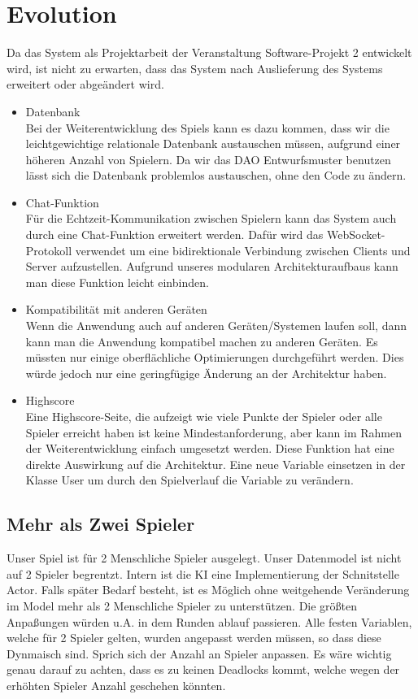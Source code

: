 \documentclass[fontsize=12pt,paper=a4,twoside]{scrartcl}
\begin{document}
\section{Evolution} \label{sec:evolution}

Da das System als Projektarbeit der Veranstaltung Software-Projekt 2 entwickelt wird,
ist nicht zu erwarten, dass das System nach Auslieferung des Systems erweitert oder abgeändert wird.

\begin{itemize}
	\item Datenbank\\ Bei der Weiterentwicklung des Spiels kann es dazu kommen, dass wir die leichtgewichtige relationale Datenbank austauschen müssen, aufgrund einer höheren Anzahl von Spielern. Da wir das DAO Entwurfsmuster benutzen lässt sich die Datenbank problemlos austauschen, ohne den Code zu ändern.
	\item Chat-Funktion\\ Für die Echtzeit-Kommunikation zwischen Spielern kann das System auch durch eine Chat-Funktion erweitert werden. Dafür wird das WebSocket-Protokoll verwendet um eine bidirektionale Verbindung zwischen Clients und Server aufzustellen. Aufgrund unseres modularen Architekturaufbaus kann man diese Funktion leicht einbinden.
	\item Kompatibilität mit anderen Geräten\\ Wenn die Anwendung auch auf anderen Geräten/Systemen laufen soll, dann kann man die Anwendung kompatibel machen zu anderen Geräten. Es müssten nur einige oberflächliche Optimierungen durchgeführt werden. Dies würde jedoch nur eine geringfügige Änderung an der Architektur haben.
	\item Highscore\\ Eine Highscore-Seite, die aufzeigt wie viele Punkte der Spieler oder alle Spieler erreicht haben ist keine Mindestanforderung, aber kann im Rahmen der Weiterentwicklung einfach umgesetzt werden. Diese Funktion hat eine direkte Auswirkung auf die Architektur. Eine neue Variable einsetzen in der Klasse User um durch den Spielverlauf die Variable zu verändern.
\end{itemize}

\subsection{Mehr als Zwei Spieler}
Unser Spiel ist für 2 Menschliche Spieler ausgelegt. Unser Datenmodel ist nicht auf 2 Spieler begrentzt. Intern
ist die KI eine Implementierung der Schnitstelle Actor. Falls später Bedarf besteht, ist es Möglich ohne weitgehende Veränderung im Model
mehr als 2 Menschliche Spieler zu unterstützen. Die größten Anpaßungen würden u.A. in dem Runden ablauf passieren. Alle festen Variablen, welche für 2 Spieler gelten, wurden angepasst werden müssen, so dass diese Dynmaisch sind. Sprich sich der Anzahl an Spieler anpassen.
Es wäre wichtig genau darauf zu achten, dass es zu keinen Deadlocks kommt, welche wegen der erhöhten Spieler Anzahl geschehen könnten.

\end{document}
